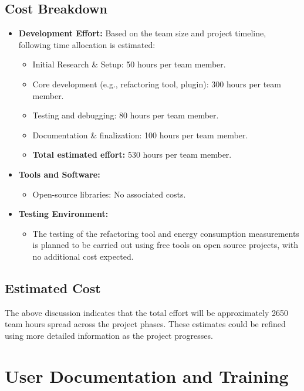 \documentclass[12pt]{article}
\begin{document}
\subsection{Cost Breakdown}
\begin{itemize}
  \item \textbf{Development Effort:} Based on the team size and
    project timeline, following time allocation is estimated:
    \begin{itemize}
      \item Initial Research \& Setup: 50 hours per team member.
      \item Core development (e.g., refactoring tool, plugin): 300
        hours per team member.
      \item Testing and debugging: 80 hours per team member.
      \item Documentation \& finalization: 100 hours per team member.
      \item \textbf{Total estimated effort:} 530 hours per team member.
    \end{itemize}

  \item \textbf{Tools and Software:}
    \begin{itemize}
      \item Open-source libraries: No associated costs.
    \end{itemize}

  \item \textbf{Testing Environment:}
    \begin{itemize}
      \item The testing of the refactoring tool and energy
        consumption measurements is planned to be carried out using
        free tools on open source projects, with no additional cost expected.
    \end{itemize}

\end{itemize}

\subsection{Estimated Cost}
The above discussion indicates that the total effort will be
approximately 2650 team hours spread across the project phases. These
estimates could be refined using more detailed information as the
project progresses.
\section{User Documentation and Training}
\end{document}
